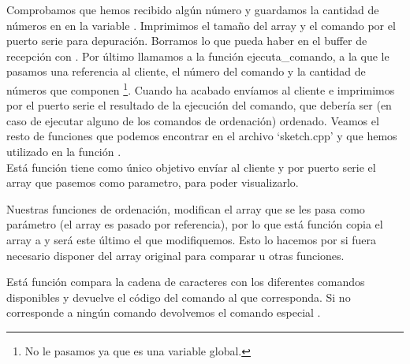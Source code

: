 
Comprobamos que hemos recibido algún número y guardamos la cantidad de números en  en la variable . Imprimimos el tamaño del array y el comando por el puerto serie para depuración. Borramos lo que pueda haber en el buffer de recepción con . Por último llamamos a la función ejecuta\_comando, a la que le pasamos una referencia al cliente, el número del comando y la cantidad de números que componen \protect\footnote{No le pasamos  ya que es una variable global.}. Cuando ha acabado envíamos al cliente e imprimimos por el puerto serie el resultado de la ejecución del comando, que debería ser (en caso de ejecutar alguno de los comandos de ordenación)  ordenado.
\newline
Veamos el resto de funciones que podemos encontrar en el archivo `sketch.cpp' y que hemos utilizado en la función .\\


Está función tiene como único objetivo envíar al cliente y por puerto serie el array que pasemos como parametro, para poder visualizarlo.


Nuestras funciones de ordenación, modifican el array que se les pasa como parámetro (el array es pasado por referencia), por lo que está función copia el array  a  y será este último el que modifiquemos. Esto lo hacemos por si fuera necesario disponer del array original para comparar u otras funciones.


Está función compara la cadena de caracteres  con los diferentes comandos disponibles y devuelve el código del comando al que corresponda. Si no corresponde a ningún comando devolvemos el comando especial .


